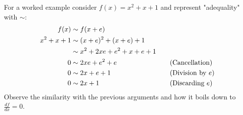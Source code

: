 For a worked example consider $f(x)=x^2+x+1$ and represent "adequality" with $\sim$:
\[\begin{aligned}
	f(x)&\sim f(x+e)&&\\
	x^2+x+1&\sim (x+e)^2+(x+e)+1&&\\
	&\sim x^2+2xe+e^2+x+e+1&&\\
	0&\sim 2xe+e^2+e &&\text{\quad (Cancellation)}\\
	0&\sim 2x+e+1 &&\text{\quad (Division by $e$)}\\
	0&\sim 2x+1 &&\text{\quad (Discarding $e$)}\\
\end{aligned}\]
Observe the similarity with the previous arguments and how it boils down to $\frac{df}{dx}=0$.
